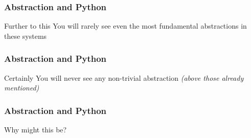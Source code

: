 \begin{frame}
\frametitle{Abstraction and Python}
\begin{block}{Further to this}
You will rarely see even the most fundamental abstractions in these systems
\end{block}
\end{frame}


\begin{frame}
\frametitle{Abstraction and Python}
\begin{block}{Certainly}
You will never see any non-trivial abstraction \tiny{\emph{(above those already mentioned)}}\normalsize
\end{block}
\end{frame}


\begin{frame}
\frametitle{Abstraction and Python}
\begin{center}
\huge{Why might this be?}
\end{center}
\normalsize
\end{frame}
